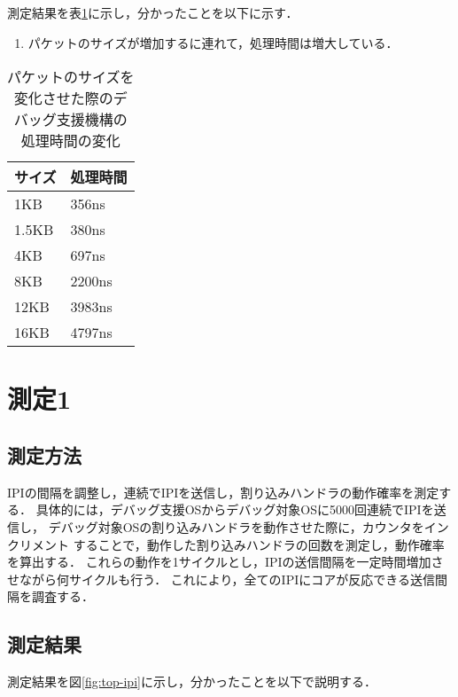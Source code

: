 \documentclass[12pt]{jsarticle}
\begin{document}
測定結果を表\ref{table:time}に示し，分かったことを以下に示す．
\begin{enumerate}
    \item パケットのサイズが増加するに連れて，処理時間は増大している．
\end{enumerate}

\begin{table}[h]
    \caption{パケットのサイズを変化させた際のデバッグ支援機構の処理時間の変化}
    \label{table:time}
    \begin{center}
        \begin{tabular}{l|l}   \hline \hline 
            サイズ    & 処理時間   \\ \hline
            1KB       & 356ns          \\ 
            1.5KB     & 380ns          \\ 
            4KB       & 697ns          \\ 
            8KB       & 2200ns          \\ 
            12KB      & 3983ns          \\ 
            16KB      & 4797ns          \\ \hline
        \end{tabular}
    \end{center}
\end{table}


\section{測定1}

\subsection{測定方法}

IPIの間隔を調整し，連続でIPIを送信し，割り込みハンドラの動作確率を測定する．
具体的には，デバッグ支援OSからデバッグ対象OSに5000回連続でIPIを送信し，
デバッグ対象OSの割り込みハンドラを動作させた際に，カウンタをインクリメント
することで，動作した割り込みハンドラの回数を測定し，動作確率を算出する．
これらの動作を1サイクルとし，IPIの送信間隔を一定時間増加させながら何サイクルも行う．
これにより，全てのIPIにコアが反応できる送信間隔を調査する．

\subsection{測定結果}\label{result-ipi-limit}
測定結果を図\ref{fig:top-ipi}に示し，分かったことを以下で説明する．
\end{document}
